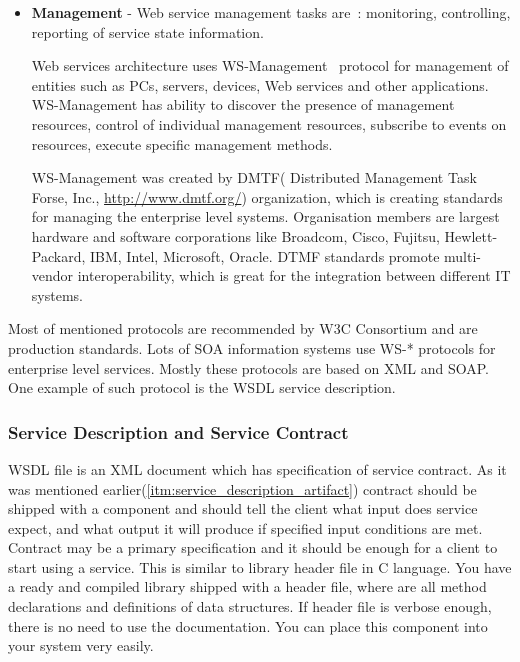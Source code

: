 \begin{itemize}
Web services architecture uses WS-Security\footnote{WS-Security (Web Services
Security, short WSS) is an extension to SOAP to apply security to web services.
It is a member of the WS-* family of web service specifications and was
published by OASIS(Organization for the Advancement of Structured Information
Standards, \url{https://www.oasis-open.org/}). \cite{wikipedia:WS-Security}}
~protocol to solve security problems.
This protocol specifies how SOAP messages may be secured.
 


\item \textbf{Management} -
Web service management tasks are~\cite{ws_arch}: monitoring, controlling,
reporting of service state information. 

Web services architecture uses WS-Management~\cite{ws_security_promo} protocol
for management of entities such as PCs, servers, devices, Web services and other
applications. WS-Management has ability to discover the presence of management resources,
control of individual management resources, subscribe to events on resources,
execute specific management methods.

WS-Management was created by DMTF( Distributed Management Task Forse, Inc.,
\url{http://www.dmtf.org/}) organization, which is creating standards for managing
the enterprise level systems. Organisation members are largest hardware and
software corporations like Broadcom, Cisco, Fujitsu, Hewlett-Packard, IBM, Intel,
Microsoft, Oracle. DTMF standards promote multi-vendor interoperability, which
is great for the integration between different IT systems. 

\end{itemize}

Most of mentioned protocols are recommended by W3C Consortium and are production
standards. Lots of SOA information systems use WS-* protocols for
enterprise level services. Mostly these protocols are based on XML and
SOAP. One example of such protocol is the WSDL service description.

\subsubsection{Service Description and Service Contract}
\label{sec:ws_service_contract}
WSDL file is an XML document which has specification of  service contract.
As it was mentioned earlier(\autoref{itm:service_description_artifact}) contract should be shipped with a component and should  tell the
client what input does service expect, and what output it will produce if specified input conditions are met. 
Contract may be a primary specification and it should be enough for a client to start using a service.
This is similar to library header file in C language. 
You have a ready and compiled library shipped with a header file, where are all
method declarations and definitions of data structures.
If header file is verbose enough, there is no need to use the documentation. You can place this component into your system very easily.



